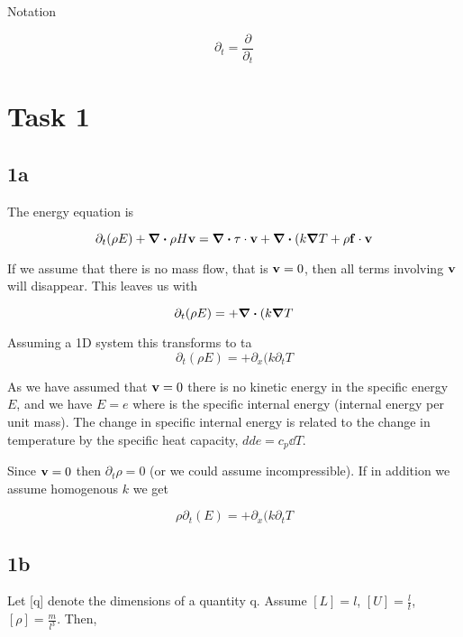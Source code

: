 \documentclass{article}
\begin{document}
Notation

\begin{equation}
	\partial_t = \frac{\partial}{\partial_t}
\end{equation}

\section{Task 1}

\subsection{1a}
The energy equation is

\begin{equation}
	\partial_t (\rho E) + \div{\rho H \mathbf{v}} = \div{\tau \cdot \mathbf{v}} + \div{(k\grad{T}}+ \rho \mathbf{f} \cdot \mathbf{v}
\end{equation}

If we assume that there is no mass flow, that is $\mathbf{v} = 0$, then all terms involving $\mathbf{v}$ will disappear. This leaves us with

\begin{equation}
	\partial_t (\rho E) = + \div{(k\grad{T}}
\end{equation}

Assuming a 1D system this transforms to
ta
\begin{equation}
	\partial_t (\rho E) = + \partial_x{(k\partial_t{T}}
\end{equation}

As we have assumed that $\mathbf{v}=0$ there is no kinetic energy in the specific energy $E$, and we have $E = e$ where is the specific internal energy (internal energy per unit mass). The change in specific internal energy is related to the change in temperature by the specific heat capacity, $dd{e} = c_p \dd{T}$.

Since $\mathbf{v} = 0$ then $\partial_t \rho = 0$ (or we could assume incompressible). If in addition we assume homogenous $k$ we get

\begin{equation}
	\rho\partial_t (E) = + \partial_x{(k\partial_t{T}}
\end{equation}

\subsection{1b}
Let [q] denote the dimensions of a quantity q. Assume $[L] = l$, $[U] = \frac{l}{t}$, $[\rho] = \frac{m}{l^3}$. Then,
\end{document}
